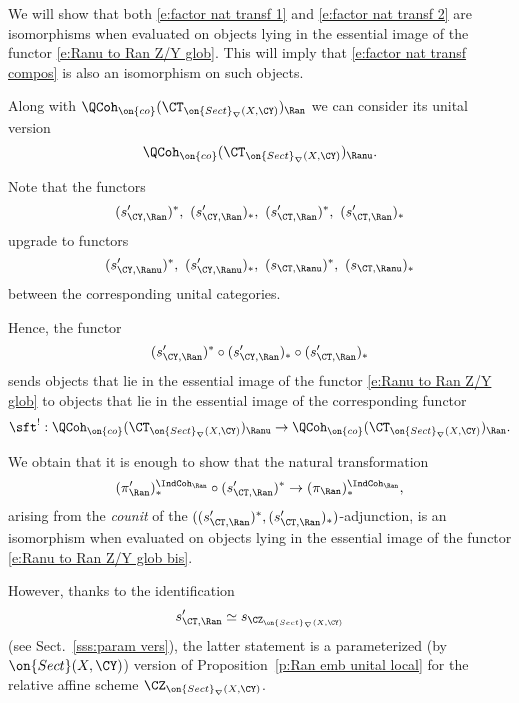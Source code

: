 \documentclass[9pt]{amsart}
\theoremstyle{remark}
\theoremstyle{definition}
\theoremstyle{remark}
\newcommand{\secref}[1]{Sect.~\ref{#1}}
\newcommand{\propref}[1]{Proposition~\ref{#1}}
\numberwithin{equation}{section}
\begin{document}
\medskip

We will show that both \eqref{e:factor nat transf 1} and \eqref{e:factor nat transf 2} are isomorphisms
when evaluated on objects lying in the essential image of the functor \eqref{e:Ranu to Ran Z/Y glob}.
This will imply that \eqref{e:factor nat transf compos} is also an isomorphism on such objects. 


Along with $\QCoh_{\on{co}}(\CT_{\on{Sect}_\nabla(X,\CY)})_\Ran$ we can consider its unital version
$$\QCoh_{\on{co}}(\CT_{\on{Sect}_\nabla(X,\CY)})_\Ranu.$$

\medskip

Note that the functors
$$(s'_{\CY,\Ran})^*,\,\,(s'_{\CY,\Ran})_*,\,\, (s'_{\CT,\Ran})^*,\,\, (s'_{\CT,\Ran})_*$$
upgrade to functors 
$$(s'_{\CY,\Ranu})^*,\,\,(s'_{\CY,\Ranu})_*,\,\, (s_{\CT,\Ranu})^*,\,\, (s_{\CT,\Ranu})_*$$
between the corresponding unital categories.

\medskip

Hence, the functor 
$$(s'_{\CY,\Ran})^*\circ (s'_{\CY,\Ran})_*\circ (s'_{\CT,\Ran})_*$$
sends objects that lie in the essential image of the functor \eqref{e:Ranu to Ran Z/Y glob} to objects that lie in the essential
image of the corresponding functor
\begin{equation} \label{e:Ranu to Ran Z/Y glob bis}
\sft^!:\QCoh_{\on{co}}(\CT_{\on{Sect}_\nabla(X,\CY)})_\Ranu\to \QCoh_{\on{co}}(\CT_{\on{Sect}_\nabla(X,\CY)})_\Ran.
\end{equation}

\medskip

We obtain that it is enough to show that the natural transformation
\begin{equation} \label{e:factor nat transf 1 red}
(\pi'_\Ran)^{\IndCoh_\Ran}_*\circ (s'_{\CT,\Ran})^*\to (\pi_\Ran)^{\IndCoh_\Ran}_*,
\end{equation}
arising from the \emph{counit} of the $((s'_{\CT,\Ran})^*,(s'_{\CT,\Ran})_*)$-adjunction, is an isomorphism when evaluated on 
objects lying in the essential image of the functor \eqref{e:Ranu to Ran Z/Y glob bis}. 

\medskip

However, thanks to the identification
$$s'_{\CT,\Ran}\simeq s_{\CZ_{\on{Sect}_\nabla(X,\CY)}}$$
(see \secref{sss:param vers}), the latter statement is a parameterized (by $\on{Sect}(X,\CY)$) version of \propref{p:Ran emb unital local} for the
relative affine scheme $\CZ_{\on{Sect}_\nabla(X,\CY)}$. 
\end{document}
